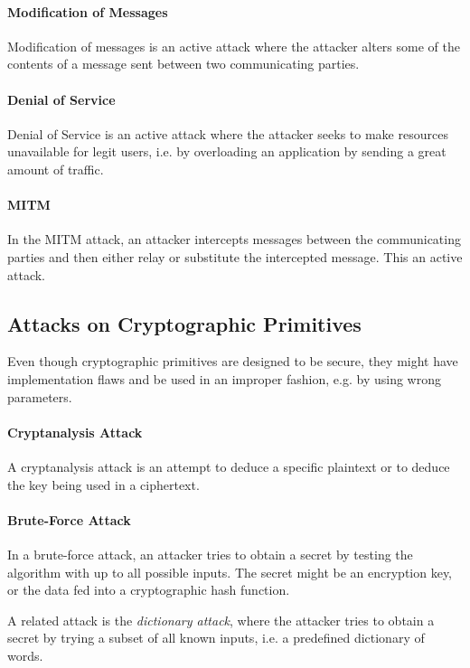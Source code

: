 \documentclass[pdftex,english,10pt,b5paper,twoside]{book}
\begin{document}
\paragraph{Modification of Messages} Modification of messages is an active
attack where the attacker alters some of the contents of a message sent between
two communicating parties.

\paragraph{Denial of Service} Denial of Service is an active attack where the
attacker seeks to make resources unavailable for legit users, i.e. by
overloading an application by sending a great amount of traffic.

\paragraph{\acl{MITM}} In the \ac{MITM} attack, an attacker intercepts messages
between the communicating parties and then either relay or substitute the
intercepted message. This an active attack.

\subsection{Attacks on Cryptographic Primitives}

Even though cryptographic primitives are designed to be secure, they might have
implementation flaws and be used in an improper fashion, e.g. by using wrong
parameters.

\paragraph{Cryptanalysis Attack} A cryptanalysis attack is an attempt to deduce
a specific plaintext or to deduce the key being used in a ciphertext.

\paragraph{Brute-Force Attack} In a brute-force attack, an attacker tries
to obtain a secret by testing the algorithm with up to all possible inputs. The
secret might be an encryption key, or the data fed into a cryptographic hash
function.

A related attack is the \emph{dictionary attack}, where the attacker
tries to obtain a secret by trying a subset of all known inputs, i.e. a
predefined dictionary of words.
\end{document}
